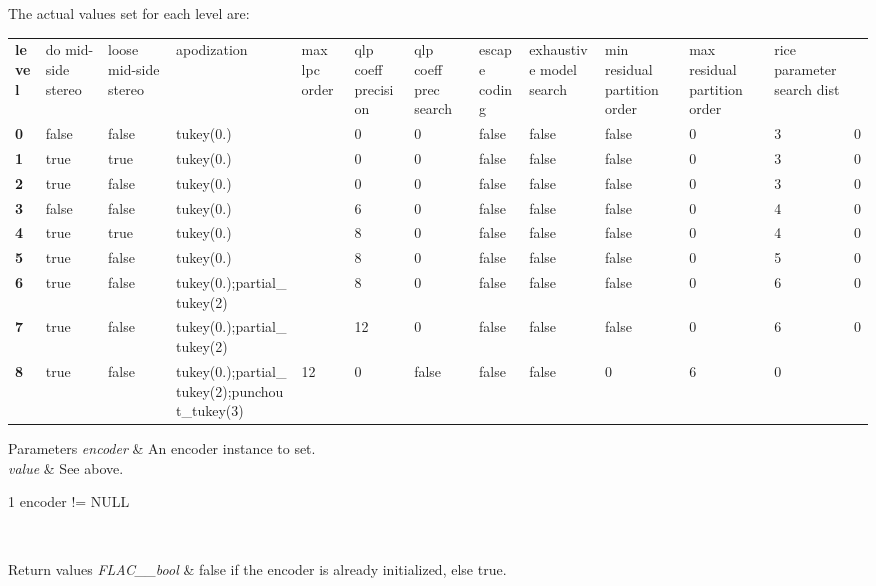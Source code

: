 The actual values set for each level are\+: \tabulinesep=1mm
\begin{longtabu} spread 0pt [c]{*13{|X[-1]}|}
\hline
{\bfseries level} &do mid-\/side stereo &loose mid-\/side stereo &apodization &max lpc order &qlp coeff precision &qlp coeff prec search &escape coding &exhaustive model search &min residual partition order &max residual partition order &rice parameter search dist  \\
{\bfseries 0} &false &false &tukey(0.)&&0 &0 &false &false &false &0 &3 &0  \\
{\bfseries 1} &true &true &tukey(0.)&&0 &0 &false &false &false &0 &3 &0  \\
{\bfseries 2} &true &false &tukey(0.)&&0 &0 &false &false &false &0 &3 &0  \\
{\bfseries 3} &false &false &tukey(0.)&&6 &0 &false &false &false &0 &4 &0  \\
{\bfseries 4} &true &true &tukey(0.)&&8 &0 &false &false &false &0 &4 &0  \\
{\bfseries 5} &true &false &tukey(0.)&&8 &0 &false &false &false &0 &5 &0  \\
{\bfseries 6} &true &false &tukey(0.);partial\+\_\+tukey(2)&&8 &0 &false &false &false &0 &6 &0  \\
{\bfseries 7} &true &false &tukey(0.);partial\+\_\+tukey(2)&&12 &0 &false &false &false &0 &6 &0  \\
{\bfseries 8} &true &false &tukey(0.);partial\+\_\+tukey(2);punchout\+\_\+tukey(3) &12 &0 &false &false &false &0 &6 &0  \\
\end{longtabu}


{} 
\begin{DoxyParams}{Parameters}
{\em encoder} & An encoder instance to set. \\
\hline
{\em value} & See above.  
\begin{DoxyCode}
1 encoder != NULL 
\end{DoxyCode}
 \\
\hline
\end{DoxyParams}

\begin{DoxyRetVals}{Return values}
{\em F\+L\+A\+C\+\_\+\+\_\+bool} & {\ttfamily false} if the encoder is already initialized, else {\ttfamily true}. \\
\hline
\end{DoxyRetVals}


